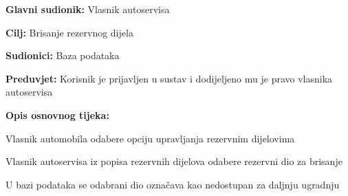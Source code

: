 					\noindent {}
					\begin{packed_item}

						\item \textbf{Glavni sudionik: } Vlasnik autoservisa
						\item  \textbf{Cilj:} Brisanje rezervnog dijela
						\item  \textbf{Sudionici:} Baza podataka
						\item  \textbf{Preduvjet:} Korisnik je prijavljen u sustav i dodijeljeno mu je pravo vlasnika autoservisa
						\item  \textbf{Opis osnovnog tijeka:}

						\item[] \begin{packed_enum}

							\item Vlasnik automobila odabere opciju upravljanja rezervnim dijelovima
							\item Vlasnik autoservisa iz popisa rezervnih dijelova odabere rezervni dio za brisanje
							\item U bazi podataka se odabrani dio označava kao nedostupan za daljnju ugradnju

						\end{packed_enum}
					\end{packed_item}


